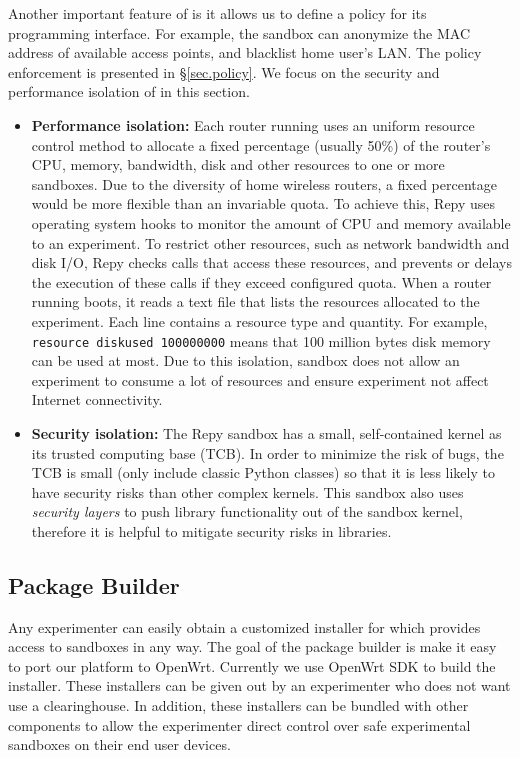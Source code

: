 Another important feature of \sandboxname is it allows us to define a policy for its programming interface. For example, the sandbox can anonymize the MAC address of available access points, and blacklist home user's LAN. The policy enforcement is presented in \S{\ref{sec.policy}}. We focus on the security and performance isolation of \sandboxname in this section.
\begin{itemize}
\item \textbf{Performance isolation: }Each router running \sysname uses an uniform resource control method to allocate a fixed percentage (usually 50\%) of the router's CPU, memory, bandwidth, disk and other resources to one or more sandboxes. Due to the diversity of home wireless routers, a fixed percentage would be more flexible than an invariable quota. To achieve this, Repy uses operating system hooks to monitor the amount of CPU and memory available to an experiment. To restrict other resources, such as network bandwidth and disk I/O, Repy checks calls that access these resources, and prevents or delays the execution of these calls if they exceed configured quota. When a router running \sysname boots, it reads a text file that lists the resources allocated to the experiment. Each line contains a resource type and quantity. For example, \texttt{resource diskused 100000000} means that 100 million bytes disk memory can be used at most. Due to this isolation, sandbox does not allow an experiment to consume a lot of resources and ensure experiment not affect Internet connectivity.

\item \textbf{Security isolation: }The Repy sandbox has a small, self-contained kernel as its trusted computing base (TCB). In order to minimize the risk of bugs, the TCB is small (only include classic Python classes) so that it is less likely to have security risks than other complex kernels. This sandbox also uses \textit{security layers} to push library functionality out of the sandbox kernel, therefore it is helpful to mitigate security risks in libraries. 

\end{itemize}
\subsection{Package Builder}
\label{sec.packagebuilder}
Any experimenter can easily obtain a customized installer for \sysname which provides access to sandboxes in any way. The goal of the package builder is make it easy to port our platform to OpenWrt. Currently we use OpenWrt SDK to build the installer. These installers can be given out by an experimenter who does not want use a clearinghouse. In addition, these installers can be bundled with other components to allow the experimenter direct control over safe experimental sandboxes on their end user devices.

